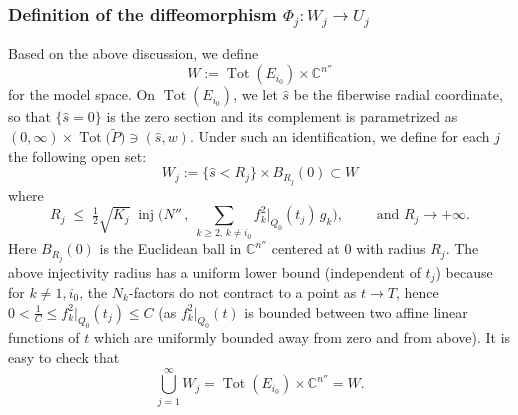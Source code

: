 \documentclass[11pt]{amsart}
\theoremstyle{plain}
\numberwithin{equation}{section}
\theoremstyle{definition}
\theoremstyle{remark}
\newtheorem*{remarkx}{Remark}
\begin{document}
%
%


\subsubsection{Definition of the diffeomorphism $\Phi_j : W_j \to U_j$}
Based on the above discussion, we define 
\[W := \operatorname{Tot} ( E_{i_0} ) \times \mathbb{C}^{n''}\]
for the model space. On $\operatorname{Tot} ( E_{i_0} )$, we let $\hat{s}$ be the fiberwise radial coordinate, so that $\{ \hat{s} = 0 \}$ is the zero section and its complement is parametrized as $( 0, \infty ) \times \operatorname{Tot}\big(\widetilde{P}\big) \ni ( \hat{s}, w )$. Under such an identification, we define for each $j$ the following open set:
\begin{equation}
\label{eq:W_j}
W_j := \{ \hat{s} < R_j \} \times B_{R_j} ( 0 ) \subset W	
\end{equation}
where
\begin{equation*}
R_j \;\leq\; \tfrac{1}{2} \sqrt{K_j}\; \operatorname{inj} \Big( N'' \, , \; \sum_{k \geq 2, \, k \neq i_0} f_k^2 |_{Q_0} ( t_j ) \, g_k \Big), \qquad \text{ and } R_j \to +\infty.
\end{equation*}
Here $B_{R_j}(0)$ is the Euclidean ball in $\mathbb{C}^{n''}$ centered at $0$ with radius $R_j$. The above injectivity radius has a uniform lower bound (independent of $t_j$) because for $k \not= 1, i_0$, the $N_k$-factors do not contract to a point as $t \to T$, hence $0 < \frac{1}{C} \leq f_k^2\big|_{Q_0}(t_j) \leq C$ (as $f_k^2\big|_{Q_0}(t)$ is bounded between two affine linear functions of $t$ which are uniformly bounded away from zero and from above). It is easy to check that
\[\bigcup_{j=1}^\infty W_j = \operatorname{Tot}(E_{i_0}) \times \mathbb{C}^{n''} = W.\]
\end{document}
